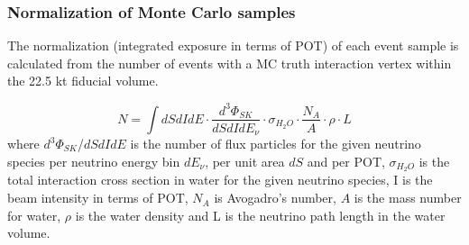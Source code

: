 \subsubsection {Normalization of Monte Carlo samples}
\label{sec:mc_templates:normalization}


The normalization (integrated exposure in terms of POT) of each event sample is calculated from
the number of events with a MC truth interaction vertex within the 22.5 kt fiducial volume.

\begin{equation}
\displaystyle
  N = \int  dS dI dE \cdot
            \frac{d^{3}\Phi_{SK}}{dS dI dE_{\nu}} \cdot
            \sigma_{H_{2}O} \cdot
            \frac{N_{A}}{A} \cdot \rho \cdot L 
\end{equation}
where 
$d^{3}\Phi_{SK}$/$dS dI dE$ is the number of flux particles for the given neutrino species 
per neutrino energy bin $dE_{\nu}$, per unit area $dS$ and per POT,
$\sigma_{H_{2}O}$ is the total interaction cross section in water
for the given neutrino species,
I is the beam intensity in terms of POT,
$N_{A}$ is  Avogadro's number,
$A$ is the mass number for water,
$\rho$ is the water density
and L is the neutrino path length in the water volume.

